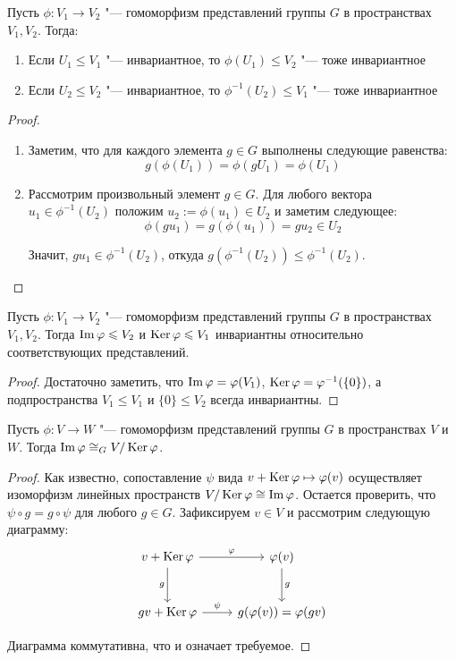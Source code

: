 \begin{proposition}
	Пусть $\phi: V_1 \to V_2$ "--- гомоморфизм представлений группы $G$ в пространствах $V_1, V_2$. Тогда:
	\begin{enumerate}
		\item Если $U_1 \le V_1$ "--- инвариантное, то $\phi(U_1) \le V_2$ "--- тоже инвариантное
		\item Если $U_2 \le V_2$ "--- инвариантное, то $\phi^{-1}(U_2) \le V_1$ "--- тоже инвариантное
	\end{enumerate}
\end{proposition}

\begin{proof}~
	\begin{enumerate}
		\item Заметим, что для каждого элемента $g \in G$ выполнены следующие равенства:
		\[g(\phi(U_1)) = \phi(gU_1) = \phi(U_1)\]
		\item Рассмотрим произвольный элемент $g \in G$. Для любого вектора $u_1 \in \phi^{-1}(U_2)$ положим $u_2 := \phi(u_1) \in U_2$ и заметим следующее:
		\[\phi(gu_1) = g(\phi(u_1)) = gu_2 \in U_2\]
		
		Значит, $gu_1 \in \phi^{-1}(U_2)$, откуда $g(\phi^{-1}(U_2)) \le \phi^{-1}(U_2)$.\qedhere
	\end{enumerate}
\end{proof}

\begin{corollary}
	Пусть $\phi: V_1 \to V_2$ "--- гомоморфизм представлений группы $G$ в пространствах $V_1, V_2$. Тогда $\operatorname{Im}\varphi \leqslant V_2$ и $\operatorname{Ker}\varphi \leqslant V_1$ инвариантны относительно соответствующих представлений.
\end{corollary}

\begin{proof}
	Достаточно заметить, что $\operatorname{Im}\varphi = \varphi(V_1)$, $\operatorname{Ker}\varphi = \varphi^{-1}(\{0\})$, а подпространства $V_1 \le V_1$ и $\{0\} \le V_2$ всегда инвариантны.
\end{proof}

\begin{theorem}
	Пусть $\phi: V \to W$ "--- гомоморфизм представлений группы $G$ в пространствах $V$ и $W$. Тогда $\operatorname{Im}\varphi \cong_G V / \operatorname{Ker}\varphi$.
\end{theorem}

\begin{proof}
	Как известно, сопоставление $\psi$ вида $v + \operatorname{Ker}\varphi \mapsto \varphi(v)$ осуществляет изоморфизм линейных пространств $V / \operatorname{Ker}\varphi \cong \operatorname{Im}\varphi$. Остается проверить, что $\psi \circ g = g \circ \psi$ для любого $g \in G$. Зафиксируем $v \in V$ и рассмотрим следующую диаграмму:
	\[
	\begin{tikzcd}[row sep = large]
		v + \ke\phi \arrow[swap]{d}{g} \arrow{r}{\phi} & \phi(v) \arrow{d}{g}\\
		gv + \ke\phi \arrow{r}{\psi} & g(\phi(v)) = \phi(gv)
	\end{tikzcd}
	\]
	
	Диаграмма коммутативна, что и означает требуемое.
\end{proof}

